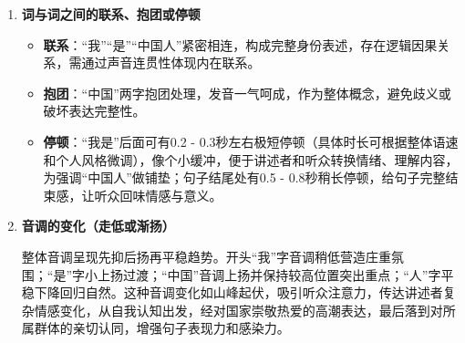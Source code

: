{\begin{enumerate}
    \item \textbf{词与词之间的联系、抱团或停顿}
        \begin{itemize}
            \item \textbf{联系}：“我”“是”“中国人”紧密相连，构成完整身份表述，存在逻辑因果关系，需通过声音连贯性体现内在联系。
            \item \textbf{抱团}：“中国”两字抱团处理，发音一气呵成，作为整体概念，避免歧义或破坏表达完整性。
            \item \textbf{停顿}：“我是”后面可有0.2 - 0.3秒左右极短停顿（具体时长可根据整体语速和个人风格微调），像个小缓冲，便于讲述者和听众转换情绪、理解内容，为强调“中国人”做铺垫；句子结尾处有0.5 - 0.8秒稍长停顿，给句子完整结束感，让听众回味情感与意义。
        \end{itemize}
    \item \textbf{音调的变化（走低或渐扬）}
    
        整体音调呈现先抑后扬再平稳趋势。开头“我”字音调稍低营造庄重氛围；“是”字小上扬过渡；“中国”音调上扬并保持较高位置突出重点；“人”字平稳下降回归自然。这种音调变化如山峰起伏，吸引听众注意力，传达讲述者复杂情感变化，从自我认知出发，经对国家崇敬热爱的高潮表达，最后落到对所属群体的亲切认同，增强句子表现力和感染力。
\end{enumerate}
}



